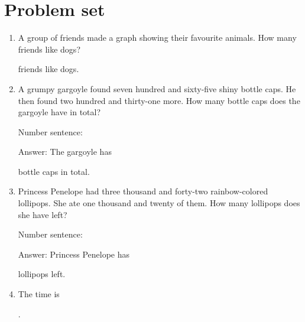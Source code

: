\documentclass{tufte-book}
\begin{document}
\clearpage\section{Problem set }

\begin{enumerate}
\item {}
A group of friends made a graph showing their favourite animals.
How many friends like dogs?\medskip

\dotfill\medskip friends like dogs.

\item A grumpy gargoyle found seven hundred and sixty-five shiny bottle caps. He then found two hundred and thirty-one more. How many bottle caps does the gargoyle have in total?\medskip\par
Number sentence: \dotfill\medskip\par
Answer: The gargoyle has 
\dotfill\medskip\par\mbox{}\dotfill\medskip\par\mbox{}\dotfill\bigskip
 bottle caps in total.
\item Princess Penelope had three thousand and forty-two rainbow-colored lollipops. She ate one thousand and twenty of them. How many lollipops does she have left?\medskip\par
Number sentence: \dotfill\medskip\par
Answer: Princess Penelope has 
\dotfill\medskip\par\mbox{}\dotfill\medskip\par\mbox{}\dotfill\bigskip
 lollipops left.

\item {}
The time is \dotfill\medskip\par\dotfill\medskip.

\end{enumerate}
\end{document}

